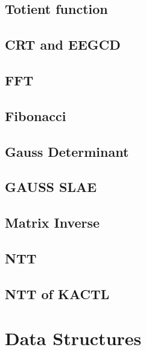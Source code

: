 \subsection{Totient function}
\raggedbottom
\hrulefill
\subsection{CRT and EEGCD}
\raggedbottom
\hrulefill
\subsection{FFT}
\raggedbottom
\hrulefill
\subsection{Fibonacci}
\raggedbottom
\hrulefill
\subsection{Gauss Determinant}
\raggedbottom
\hrulefill
\subsection{GAUSS SLAE}
\raggedbottom
\hrulefill
\subsection{Matrix Inverse}
\raggedbottom
\hrulefill
\subsection{NTT}
\raggedbottom
\hrulefill
\subsection{NTT of KACTL}
\raggedbottom
\hrulefill

\section{Data Structures}
